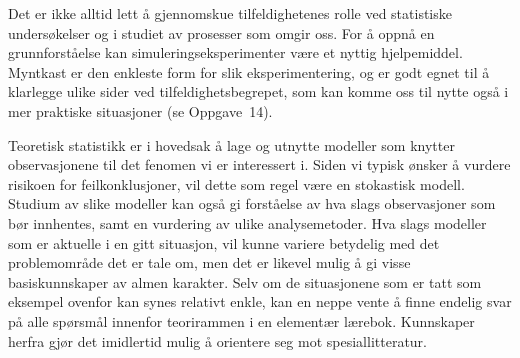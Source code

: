 Det er ikke alltid lett å gjennomskue tilfeldighetenes rolle 
ved sta\-tistiske undersøkelser og i studiet av prosesser som omgir oss.
For å oppnå en grunnforståelse kan simuleringseksperimenter
være et nyttig hjelpemiddel.  Myntkast er den enkleste form for slik
eksperimentering, og er godt egnet til å klarlegge ulike sider
ved tilfeldighetsbegrepet, som kan komme oss til nytte også i mer praktiske
situasjoner (se Oppgave~14).

Teoretisk statistikk er i hovedsak å lage og utnytte modeller som
knytter observasjonene til det fenomen vi er interessert i.
Siden vi typisk ønsker å
vurdere risikoen for feilkonklusjoner, vil dette som regel være en
stokastisk modell. Studium av slike modeller kan også gi
forståelse av hva slags observasjoner som bør innhentes, samt
en vurdering av ulike analysemetoder. Hva slags modeller som er
aktuelle i en gitt situasjon, vil kunne variere betydelig med
det problemområde det er tale om, men det er likevel mulig å
gi visse basiskunnskaper av almen karakter. Selv om de
situasjonene som er tatt som eksempel ovenfor kan
synes relativt enkle, kan en neppe vente å finne endelig svar på alle
spørsmål innenfor teorirammen i en elementær lærebok. 
Kunnskaper herfra gjør det imidlertid mulig å orientere seg mot spesiallitteratur.

